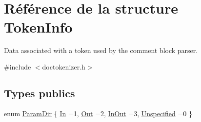 \hypertarget{struct_token_info}{}\section{Référence de la structure Token\+Info}
\label{struct_token_info}


Data associated with a token used by the comment block parser.  




{\ttfamily \#include $<$doctokenizer.\+h$>$}

\subsection*{Types publics}
\begin{DoxyCompactItemize}
\item 
enum \hyperlink{struct_token_info_acc77be95dcb06cac9e3954a1ab62c443}{Param\+Dir} \{ \hyperlink{struct_token_info_acc77be95dcb06cac9e3954a1ab62c443a430d723273d0bce74134074236310cb3}{In} =1, 
\hyperlink{struct_token_info_acc77be95dcb06cac9e3954a1ab62c443a015517728a8cf2e9afa7daf358494b7f}{Out} =2, 
\hyperlink{struct_token_info_acc77be95dcb06cac9e3954a1ab62c443ab035bcc98eb9bf542c4ab3d20b3ad3ca}{In\+Out} =3, 
\hyperlink{struct_token_info_acc77be95dcb06cac9e3954a1ab62c443a4970bd30967b6173cb3aeb899cfc7a1a}{Unspecified} =0
 \}
\end{DoxyCompactItemize}

